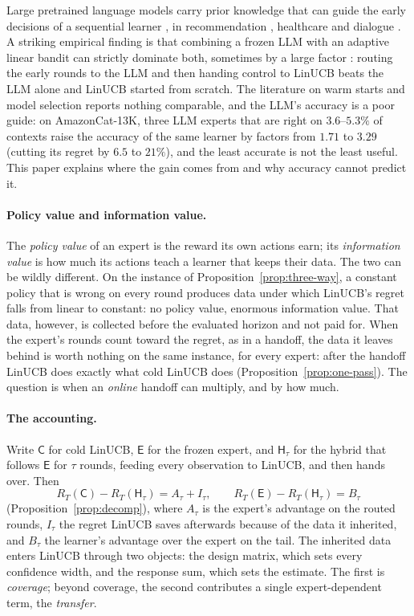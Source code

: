 \documentclass[anon]{alt2027} %
\newcommand{\Cold}{\mathsf{C}}
\newcommand{\Exp}{\mathsf{E}}
\newcommand{\Hyb}{\mathsf{H}}
\begin{document}
Large pretrained language models carry prior knowledge that can guide the
early decisions of a sequential learner
\citep{brown2020language,ouyang2022training,achiam2023gpt,alamdari2024jumpstarting,abbasiyadkori2024believe},
in recommendation \citep{li2010contextual,agarwal2016making}, healthcare
\citep{tewari2017ads,svensson2023sequential} and dialogue \citep{li2016deep}.
A striking empirical finding is that combining a frozen LLM with an adaptive
linear bandit can strictly dominate both, sometimes by a large factor
\citep{chen2024llmdecision,huangcontextual}: routing the early rounds to the
LLM and then handing control to LinUCB beats the LLM alone and LinUCB started
from scratch. The literature on warm starts and model selection
\citep{bastani2021mostly,zhang2019warm,agarwal2017corralling} reports nothing
comparable, and the LLM's accuracy is a poor guide: on AmazonCat-13K, three
LLM experts that are right on $3.6$--$5.3\%$ of contexts raise the accuracy of
the same learner by factors from $1.71$ to $3.29$ (cutting its regret by $6.5$
to $21\%$), and the least accurate is not the least useful. This paper
explains where the gain comes from and why accuracy cannot predict it.

\paragraph{Policy value and information value.}
The \emph{policy value} of an expert is the reward its own actions earn; its
\emph{information value} is how much its actions teach a learner that keeps
their data. The two can be wildly different. On the instance of
Proposition~\ref{prop:three-way}, a constant policy that is wrong on every
round produces data under which LinUCB's regret falls from linear to
constant: no policy value, enormous information value. That data, however, is
collected before the evaluated horizon and not paid for. When the expert's
rounds count toward the regret, as in a handoff, the data it leaves behind is
worth nothing on the same instance, for every expert: after the handoff
LinUCB does exactly what cold LinUCB does (Proposition~\ref{prop:one-pass}). The question
is when an \emph{online} handoff can multiply, and by how much.

\paragraph{The accounting.}
Write $\Cold$ for cold LinUCB, $\Exp$ for the frozen expert, and $\Hyb_\tau$
for the hybrid that follows $\Exp$ for $\tau$ rounds, feeding every
observation to LinUCB, and then hands over. Then
\[
R_T(\Cold)-R_T(\Hyb_\tau)=A_\tau+I_\tau,\qquad R_T(\Exp)-R_T(\Hyb_\tau)=B_\tau
\]
(Proposition~\ref{prop:decomp}), where $A_\tau$ is the expert's advantage on
the routed rounds, $I_\tau$ the regret LinUCB saves afterwards because of the
data it inherited, and $B_\tau$ the learner's advantage over the expert on
the tail. The inherited data enters LinUCB through two objects: the design
matrix, which sets every confidence width, and the response sum, which sets
the estimate. The first is \emph{coverage}; beyond coverage, the second
contributes a single expert-dependent term, the \emph{transfer}.
\end{document}
